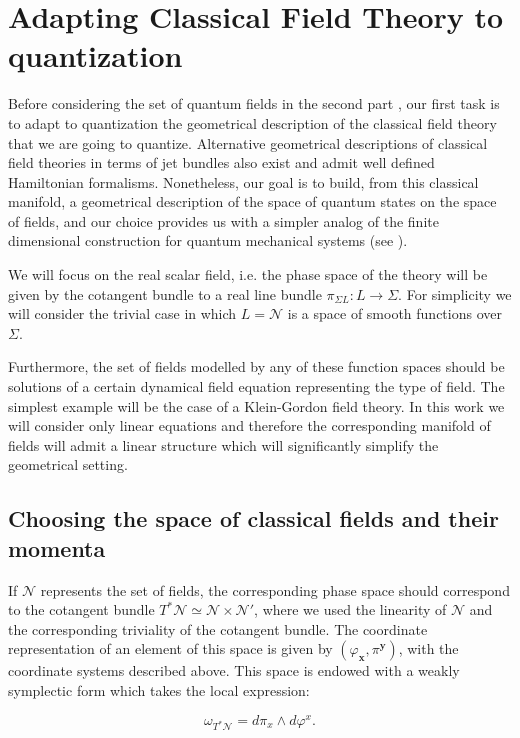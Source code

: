 \documentclass[12pt]{article}%
\begin{document}
\section{Adapting Classical Field Theory to quantization}
\label{sec:CFTQuantizar}
Before considering the set of quantum fields in the second part \cite{alonso2023a}, our first task is to adapt to quantization the geometrical description of the classical field theory that we are going to quantize. Alternative geometrical descriptions of classical field theories in terms of jet bundles also exist and admit  well defined Hamiltonian formalisms. Nonetheless, our goal is to build, from this classical manifold, a geometrical description of the space of quantum states on the space of fields, and our choice provides us with a simpler analog of the finite dimensional construction for quantum mechanical systems (see \cite{Kibble1979}).

We will focus on the real scalar field, i.e. the phase space of the theory will be given by the cotangent bundle to a real line bundle $\pi_{\Sigma L}:L\to \Sigma$. For simplicity we will consider the trivial case in which $L=\mathcal{N}$ is a space of smooth functions over $\Sigma$.

Furthermore, the set of fields modelled by any of these function spaces should be solutions of a certain dynamical field equation representing the type of field. The simplest example will be the case of a Klein-Gordon field theory. In this work we will consider only linear equations and therefore the corresponding manifold of fields will admit a linear structure which will significantly simplify the geometrical setting. 

\subsection{Choosing the space of classical fields and their momenta}

If $\mathcal{N}$ represents the set of fields, the corresponding phase space should correspond to the cotangent bundle $T^*\mathcal{N}\simeq \mathcal{N}\times \mathcal{N}'$, where we used the linearity of $\mathcal{N}$ and the corresponding triviality of the cotangent bundle. The coordinate representation of an element of this space is given by $(\varphi_\mathbf{x},\pi^\mathbf{y})$, with the coordinate systems described above. This space is endowed with a weakly symplectic form  which takes the local expression:

\begin{equation}
\label{eq:symplecticForm}
\omega_{T^*\mathcal{N}}=  d\pi_x \wedge d\varphi^x.
\end{equation}
\end{document}
